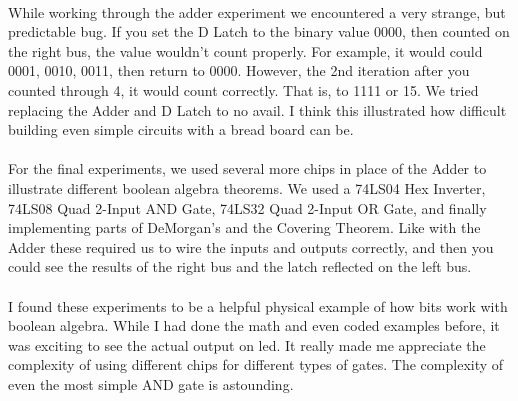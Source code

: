 \documentclass[12pt,a4paper]{report}
\begin{document}
\paragraph{}
While working through the adder experiment we encountered a very strange, but predictable bug. If you set the D Latch to the binary value 0000, then counted on the right bus, the value wouldn't count properly. For example, it would could 0001, 0010, 0011, then return to 0000. However, the 2nd iteration after you counted through 4, it would count correctly. That is, to 1111 or 15. We tried replacing the Adder and D Latch to no avail. I think this illustrated how difficult building even simple circuits with a bread board can be. 

\paragraph{} 
For the final experiments, we used several more chips in place of the Adder to illustrate different boolean algebra theorems. We used a 74LS04 Hex Inverter, 74LS08 Quad 2-Input AND Gate, 74LS32 Quad 2-Input OR Gate, and finally implementing parts of DeMorgan's and the Covering Theorem. Like with the Adder these required us to wire the inputs and outputs correctly, and then you could see the results of the right bus and the latch reflected on the left bus. 

\paragraph{}
I found these experiments to be a helpful physical example of how bits work with boolean algebra. While I had done the math and even coded examples before, it was exciting to see the actual output on led. It really made me appreciate the complexity of using different chips for different types of gates. The complexity of even the most simple AND gate is astounding. 
\end{document}
